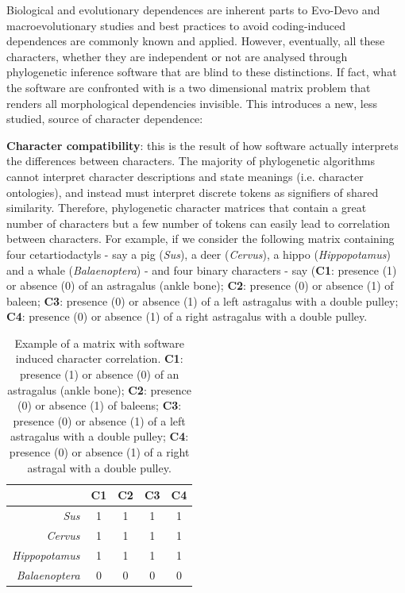 \documentclass[12pt,letterpaper]{article}
\begin{document}
Biological and evolutionary dependences are inherent parts to Evo-Devo and macroevolutionary studies and best practices to avoid coding-induced dependences are commonly known and applied.
However, eventually, all these characters, whether they are independent or not are analysed through phylogenetic inference software that are blind to these distinctions.
If fact, what the software are confronted with is a two dimensional matrix problem that renders all morphological dependencies invisible.
This introduces a new, less studied, source of character dependence:

\noindent \textbf{Character compatibility}: this is the result of how software actually interprets the differences between characters.
The majority of phylogenetic algorithms cannot interpret character descriptions and state meanings (i.e. character ontologies), and instead must interpret discrete tokens as signifiers of shared similarity.
Therefore, phylogenetic character matrices that contain a great number of characters but a few number of tokens can easily lead to correlation between characters. %
For example, if we consider the following matrix containing four cetartiodactyls - say a pig (\textit{Sus}), a deer (\textit{Cervus}), a hippo (\textit{Hippopotamus}) and a whale (\textit{Balaenoptera}) - and four binary characters - say (\textbf{C1}: presence (1) or absence (0) of an astragalus (ankle bone); \textbf{C2}: presence (0) or absence (1) of baleen; \textbf{C3}: presence (0) or absence (1) of a left astragalus with a double pulley; \textbf{C4}: presence (0) or absence (1) of a right astragalus with a double pulley.

\begin{table}
\center
    \begin{tabular}{r|cccc}
            & C1 & C2 & C3 & C4\\
        \hline
        \textit{Sus} & 1 & 1 & 1 & 1\\
        \textit{Cervus} & 1 & 1 & 1 & 1\\
        \textit{Hippopotamus} & 1 & 1 & 1 & 1\\
        \textit{Balaenoptera} & 0 & 0 & 0 & 0\\
    \end{tabular}
    \caption{Example of a matrix with software induced character correlation. \textbf{C1}: presence (1) or absence (0) of an astragalus (ankle bone); \textbf{C2}: presence (0) or absence (1) of baleens; \textbf{C3}: presence (0) or absence (1) of a left astragalus with a double pulley; \textbf{C4}: presence (0) or absence (1) of a right astragal with a double pulley.}
    \label{Tab:example_matrix}
\end{table}
\end{document}
